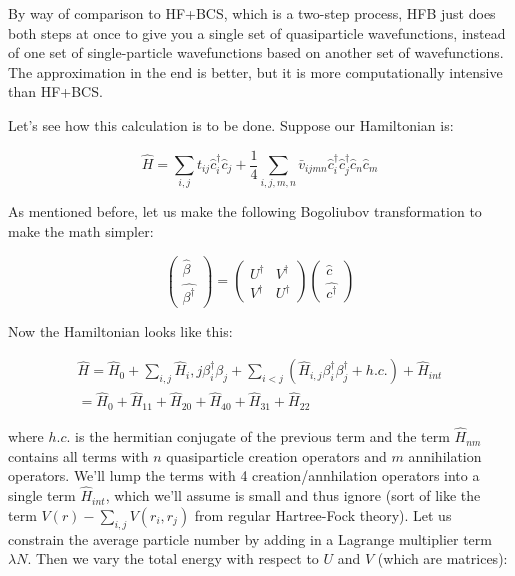 By way of comparison to HF+BCS, which is a two-step process, HFB just does both steps at once to give you a single set of quasiparticle wavefunctions, instead of one set of single-particle wavefunctions based on another set of wavefunctions. The approximation in the end is better, but it is more computationally intensive than HF+BCS.

Let's see how this calculation is to be done. Suppose our Hamiltonian is:

\begin{equation}
\hat{H}=\sum\limits_{i,j} t_{ij} \hat{c}_i^\dagger \hat{c}_j + \frac{1}{4}\sum\limits_{i,j,m,n} \bar{v}_{ijmn} \hat{c}_i^\dagger \hat{c}_j^\dagger \hat{c}_n \hat{c}_m
\end{equation}

As mentioned before, let us make the following Bogoliubov transformation to make the math simpler:

\begin{equation}
\left(\begin{array}{c}
\hat{\beta} \\
\hat{\beta^\dagger}
\end{array}\right)
= \left(\begin{array}{cc}
U^\dagger & V^\dagger \\
V^\dagger & U^\dagger
\end{array}\right) \left(\begin{array}{c}
\hat{c} \\
\hat{c^\dagger}
\end{array}\right) \label{HFBqp}
\end{equation}

\noindent Now the Hamiltonian looks like this:

\begin{eqnarray}
\hat{H} = \hat{H}_0 + \sum\limits_{i,j}\hat{H}_i,j\beta_i^\dagger\beta_j + \sum\limits_{i<j}(\hat{H}_{i,j}\beta_i^\dagger\beta_j^\dagger + h.c.) + \hat{H}_{int} \nonumber\\
= \hat{H}_0 + \hat{H}_{11} + \hat{H}_{20} + \hat{H}_{40} + \hat{H}_{31} + \hat{H}_{22}
\end{eqnarray}

\noindent where $h.c.$ is the hermitian conjugate of the previous term and the term $\hat{H}_{nm}$ contains all terms with $n$ quasiparticle creation operators and $m$ annihilation operators. We'll lump the terms with 4 creation/annhilation operators into a single term $\hat{H}_{int}$, which we'll assume is small and thus ignore (sort of like the term $V(r)-\sum_{i,j}V(r_i,r_j)$ from regular Hartree-Fock theory). Let us constrain the average particle number by adding in a Lagrange multiplier term $\lambda N$. Then we vary the total energy with respect to $U$ and $V$ (which are matrices):

